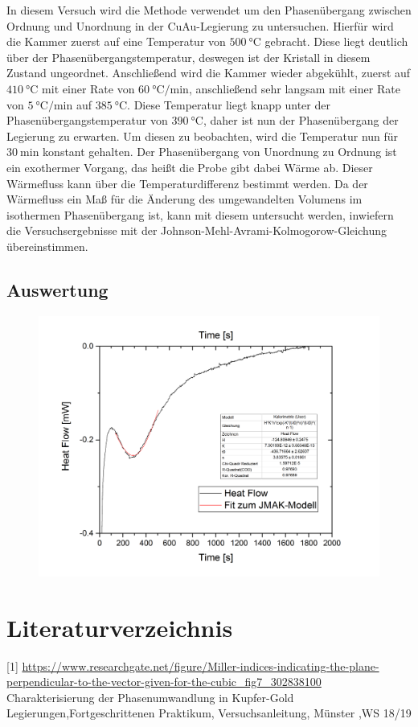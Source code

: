 \documentclass[
	a4paper,
	12pt,
	pagesize,
	ngerman
]{scrartcl}
\begin{document}
In diesem Versuch wird die Methode verwendet um den Phasenübergang zwischen Ordnung und Unordnung in der CuAu-Legierung zu untersuchen. Hierfür wird die Kammer zuerst auf eine Temperatur von $\SI{500}{\degreeCelsius}$ gebracht. Diese liegt deutlich über der Phasenübergangstemperatur, deswegen ist der Kristall in diesem Zustand ungeordnet. Anschließend wird die Kammer wieder abgekühlt, zuerst auf $\SI{410}{\degreeCelsius}$ mit einer Rate von $\SI{60}{\degreeCelsius/\minute}$, anschließend sehr langsam mit einer Rate von $\SI{5}{\degreeCelsius/\minute}$ auf $\SI{385}{\degreeCelsius}$. Diese Temperatur liegt knapp unter der Phasenübergangstemperatur von $\SI{390}{\degreeCelsius}$, daher ist nun der Phasenübergang der Legierung zu erwarten. Um diesen zu beobachten, wird die Temperatur nun für $\SI{30}{\minute}$ konstant gehalten. Der Phasenübergang von Unordnung zu Ordnung ist ein exothermer Vorgang, das heißt die Probe gibt dabei Wärme ab. Dieser Wärmefluss kann über die Temperaturdifferenz bestimmt werden. Da der Wärmefluss ein Maß für die Änderung des umgewandelten Volumens im isothermen Phasenübergang ist, kann mit diesem untersucht werden, inwiefern die Versuchsergebnisse mit der Johnson-Mehl-Avrami-Kolmogorow-Gleichung übereinstimmen.

\subsection{Auswertung}
\begin{figure}[h]
	\centering
	\includegraphics[scale=0.6]{Graph3.png}
	\caption{}
	\label{3}
\end{figure}	

\section{Literaturverzeichnis}
[1] \url{https://www.researchgate.net/figure/Miller-indices-indicating-the-plane-perpendicular-to-the-vector-given-for-the-cubic_fig7_302838100}\\
[2] Charakterisierung der Phasenumwandlung in Kupfer-Gold Legierungen,Fortgeschrittenen Praktikum, Versuchsanleitung, Münster ,WS 18/19
\end{document}
